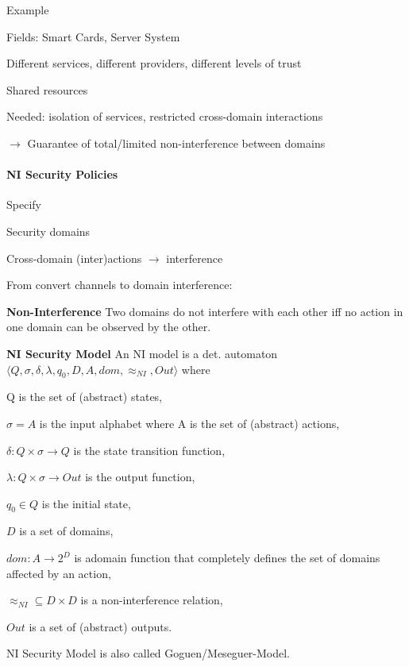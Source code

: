\documentclass[a4paper]{article}
\renewcommand{\note}[2]{\begin{noteBox} \textbf{#1} #2 \end{noteBox}}
\begin{document}
\begin{multicols}{3}
    Example
    \begin{itemize*}
        \item Fields: Smart Cards, Server System
        \item Different services, different providers, different levels of trust
        \item Shared resources
        \item Needed: isolation of services, restricted cross-domain interactions
        \item $\rightarrow$ Guarantee of total/limited non-interference between domains
    \end{itemize*}

    \paragraph{NI Security Policies}
    Specify
    \begin{itemize*}
        \item Security domains
        \item Cross-domain (inter)actions $\rightarrow$ interference
    \end{itemize*}
    From convert channels to domain interference:
    \note{Non-Interference}{Two domains do not interfere with each other iff no action in one domain can be observed by the other.}

    \note{NI Security Model}{An NI model is a det. automaton $\langle Q,\sigma,\delta,\lambda,q_0,D,A,dom,\approx_{NI},Out\rangle$ where
        \begin{itemize*}
            \item Q is the set of (abstract) states,
            \item $\sigma=A$ is the input alphabet where A is the set of (abstract) actions,
            \item $\delta:Q\times\sigma\rightarrow Q$ is the state transition function,
            \item $\lambda:Q\times\sigma\rightarrow Out$ is the output function,
            \item $q_0\in Q$ is the initial state,
            \item $D$ is a set of domains,
            \item $dom:A\rightarrow 2^D$ is adomain function that completely defines the set of domains affected by an action,
            \item $\approx_{NI}\subseteq D\times D$ is a non-interference relation,
            \item $Out$ is a set of (abstract) outputs.
        \end{itemize*}
        NI Security Model is also called Goguen/Meseguer-Model.
    }


\end{multicols}
\end{document}
